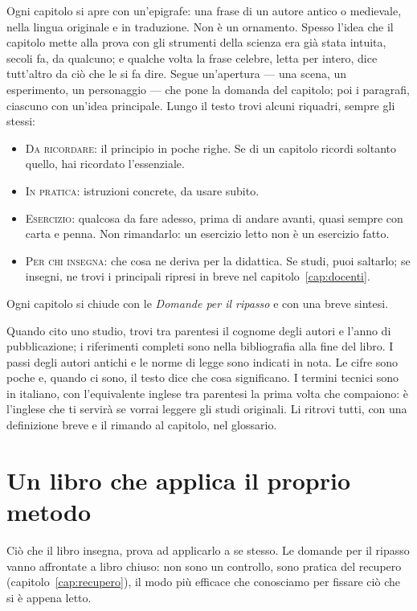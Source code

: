 Ogni capitolo si apre con un'epigrafe: una frase di un autore antico o
medievale, nella lingua originale e in traduzione. Non è un ornamento.
Spesso l'idea che il capitolo mette alla prova con gli strumenti della
scienza era già stata intuita, secoli fa, da qualcuno; e qualche volta
la frase celebre, letta per intero, dice tutt'altro da ciò che le si fa
dire. Segue un'apertura --- una scena, un esperimento, un personaggio
--- che pone la domanda del capitolo; poi i paragrafi, ciascuno con
un'idea principale. Lungo il testo trovi alcuni riquadri, sempre gli
stessi:

\begin{itemize}[leftmargin=1.2em, itemsep=0.3\baselineskip]
  \item \textsc{Da ricordare}: il principio in poche righe. Se di un
        capitolo ricordi soltanto quello, hai ricordato l'essenziale.
  \item \textsc{In pratica}: istruzioni concrete, da usare subito.
  \item \textsc{Esercizio}: qualcosa da fare adesso, prima di andare
        avanti, quasi sempre con carta e penna. Non rimandarlo: un
        esercizio letto non è un esercizio fatto.
  \item \textsc{Per chi insegna}: che cosa ne deriva per la didattica.
        Se studi, puoi saltarlo; se insegni, ne trovi i principali
        ripresi in breve nel capitolo~\ref{cap:docenti}.
\end{itemize}

\noindent Ogni capitolo si chiude con le \emph{Domande per il ripasso}
e con una breve sintesi.

Quando cito uno studio, trovi tra parentesi il cognome degli autori e
l'anno di pubblicazione; i riferimenti completi sono nella bibliografia
alla fine del libro. I passi degli autori antichi e le norme di legge
sono indicati in nota. Le cifre sono poche e, quando ci sono, il testo
dice che cosa significano. I termini tecnici sono in italiano, con
l'equivalente inglese tra parentesi la prima volta che compaiono: è
l'inglese che ti servirà se vorrai leggere gli studi originali. Li
ritrovi tutti, con una definizione breve e il rimando al capitolo, nel
glossario.

\section*{Un libro che applica il proprio metodo}

Ciò che il libro insegna, prova ad applicarlo a se stesso. Le domande
per il ripasso vanno affrontate a libro chiuso: non sono un controllo,
sono pratica del recupero (capitolo~\ref{cap:recupero}), il modo più
efficace che conosciamo per fissare ciò che si è appena letto.

